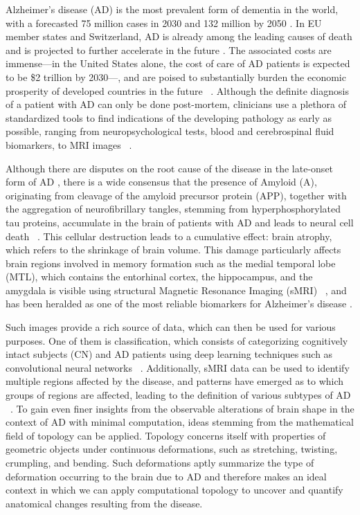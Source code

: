 \documentclass{article}
\begin{document}
Alzheimer's disease (AD) is the most prevalent form of dementia in the world, with a forecasted 75
million cases in 2030 and 132 million by 2050 \citep{world2017global}. In EU member states and
Switzerland, AD is already among the leading causes of death and is projected to further accelerate
in the future \citep{sleeman2019escalating}. The associated costs are immense---in the United
States alone, the cost of care of AD patients is expected to be \$2 trillion by 2030---, and are
poised to substantially burden the economic prosperity of developed countries in the future
~\citep{world2017global}. Although the definite diagnosis of a patient with AD can only be done
post-mortem, clinicians use a plethora of standardized tools to find indications of the developing
pathology as early as possible, ranging from neuropsychological tests, blood and cerebrospinal fluid
biomarkers, to MRI images ~\citep{mckhann2011diagnosis, smits2012early, lehmann2016biomarkers}.

Although there are disputes on the root cause of the disease in the late-onset form of AD
\citep{tharp2013origins, fulop2018can, hur2020innate}, there is a wide consensus that the presence
of Amyloid \textbeta{} (A\textbeta{}), originating from cleavage of the amyloid precursor protein
(APP), together with the aggregation of neurofibrillary tangles, stemming from hyperphosphorylated
tau proteins, accumulate in the brain of patients with AD and leads to neural cell death
~\citep{da2016insights}. This cellular destruction leads to a cumulative effect: brain atrophy,
which refers to the shrinkage of brain volume. This damage particularly affects brain regions
involved in memory formation such as the medial temporal lobe (MTL), which contains the entorhinal
cortex, the hippocampus, and the amygdala is visible using structural Magnetic Resonance Imaging
(sMRI) ~\citep{frisoni2010clinical, goedert2006century}, and has been heralded as one of the most
reliable biomarkers for Alzheimer's disease \citep{pini2016brain}.

Such images provide a rich source of data, which can then be used for various purposes. One of them
is classification, which consists of categorizing cognitively intact subjects (CN) and AD patients
using deep learning techniques such as convolutional neural networks ~\citep{wen2020convolutional}.
Additionally, sMRI data can be used to identify multiple regions affected by the disease, and
patterns have emerged as to which groups of regions are affected, leading to the definition of
various subtypes of AD ~\citep{poulakis2018heterogeneous,tijms2020pathophysiological}. To gain even
finer insights from the observable alterations of brain shape in the context of AD with minimal
computation, ideas stemming from the mathematical field of topology can be applied. Topology
concerns itself with properties of geometric objects under continuous deformations, such as
stretching, twisting, crumpling, and bending. Such deformations aptly summarize the type of
deformation occurring to the brain due to AD and therefore makes an ideal context in which we can
apply computational topology to uncover and quantify anatomical changes resulting from the disease.
\end{document}
